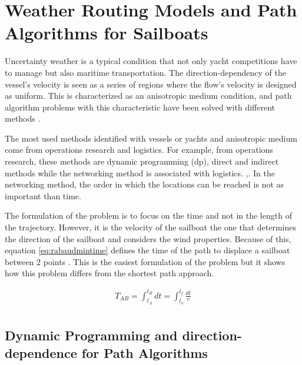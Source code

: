 \section{Weather Routing Models and Path Algorithms for Sailboats}\label{sec:weatherRoute}

Uncertainty weather is a typical condition that not only yacht competitions have to manage but also maritime transportation. The direction-dependency of the vessel's velocity is seen as a series of regions where the flow's velocity is designed as uniform. This is characterized as an anisotropic medium condition, and path algorithm problems with this characteristic have been solved with different methods \cite{dolinskaya2013fastest}. \par 
\noindent 
The most used methods identified with vessels or yachts and anisotropic medium come from operations research and logistics. For example, from operations research, these methods are dynamic programming (\acrshort{dp}), direct and indirect methods while the networking method is associated with logistics. \cite{kelly2015transcription},\cite{mitchell2000geometric}. In the networking method, the order in which the locations can be reached is not as important than time. \par 
The formulation of the problem is to focus on the time and not in the length of the trajectory. However, it is the velocity of the sailboat the one that determines the direction of the sailboat and considers the wind properties. Because of this, equation \ref{eq:rabaudmintime} defines the time of the path to displace a sailboat between 2 points \cite{rabaudoptimal}. This is the easiest formulation of the problem but it shows how this problem differs from the shortest path approach.  \par

\begin{equation} \label{eq:rabaudmintime}
\begin{aligned}
T_{AB}=\int_{t_{{A}}}^{t_{{B}}} dt=\int_{l_{o}}^{l_{f}} \frac{dl}{v}  \\
\end{aligned}
\end{equation}

\subsection{Dynamic Programming and direction-dependence for Path Algorithms} \label{sec:dynProg}

